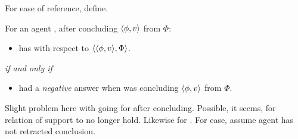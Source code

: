 \begin{note}
  For ease of reference, define.
  \begin{definition}[\izS{}]
    \label{idea:zS}
    For an agent \vAgent{}, after concluding \(\langle \phi, v \rangle\) from \(\Phi\):
    \begin{itemize}
    \item
      \vAgent{} has \zS{} with respect to \(\langle \langle \phi, v \rangle, \Phi \rangle\).
    \end{itemize}

    \emph{if and only if}

    \begin{itemize}
    \item
       had a \emph{negative} answer when \vAgent{} was concluding \(\langle \phi, v \rangle\) from \(\Phi\).
    \end{itemize}
  \end{definition}

  Slight problem here with going for after concluding.
  Possible, it seems, for relation of support to no longer hold.
  Likewise for \zS{}.
  For ease, assume agent has not retracted conclusion.
\end{note}

